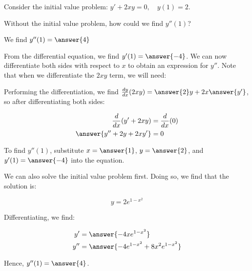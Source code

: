 \documentclass{ximera}
\author{Jim Talamo}
\begin{document}
\begin{exercise}
Consider the initial value problem: $y' +2xy = 0, \quad y(1)=2$.

Without the initial value problem, how could we find $y''(1)$?

\begin{multipleChoice}
\end{multipleChoice}

We find $y''(1) = \answer{4} $

\begin{hint}
From the differential equation, we find $y'(1) = \answer{-4}$.  We can now differentiate both sides with respect to $x$ to obtain an expression for $y''$.  Note that when we differentiate the $2xy$ term, we will need:

\begin{selectAll}
\end{selectAll}

Performing the differentiation, we find $\frac{dy}{dx} (2xy) = \answer{2}y + 2x \answer{y'}$, so after differentiating both sides:

\begin{align*}
\frac{d}{dx}(y' +2xy) &= \frac{d}{dx}(0) \\
\answer{y''+2y+2xy'} &= 0\\
\end{align*}

To find $y''(1)$, substitute $x=\answer{1}$, $y=\answer{2}$, and $y'(1) = \answer{-4}$ into the equation.
\end{hint}

\begin{exercise}
We can also solve the initial value problem first.  Doing so, we find that the solution is:

\[
y = 2 e^{1-x^2}
\]

Differentiating, we find:

\begin{align*}
y' &= \answer{-4xe^{1-x^2}} \\
y'' &= \answer{-4e^{1-x^2}+8x^2e^{1-x^2}}
\end{align*}

Hence, $y''(1) = \answer{4}$.
\end{exercise}

\end{exercise}
\end{document}

